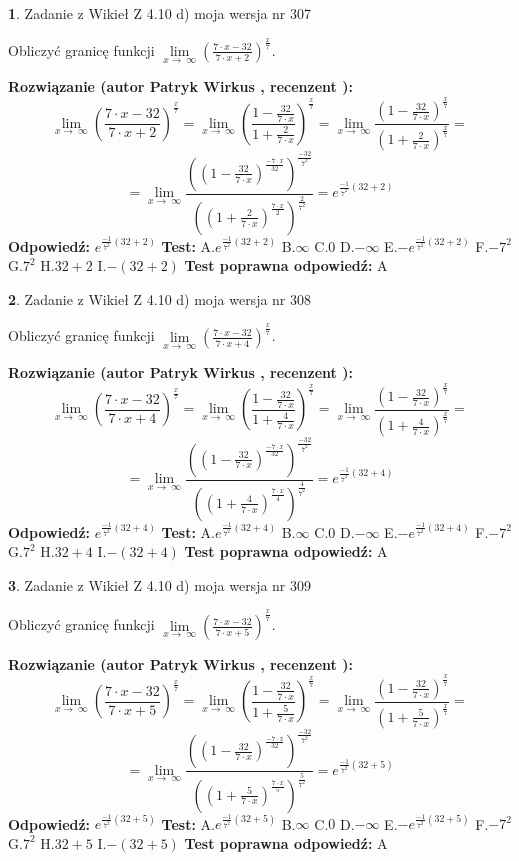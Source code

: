 \documentclass[12pt, a4paper]{article}
\theoremstyle{definition} %
\newtheorem{zad}{}
\newcommand{\zadStart}[1]{\begin{zad}#1\newline}
\newcommand{\zadStop}{\end{zad}}
\newcommand{\rozwStart}[2]{\noindent \textbf{Rozwiązanie (autor #1 , recenzent #2): }\newline}
\newcommand{\rozwStop}{\newline}
\newcommand{\odpStart}{\noindent \textbf{Odpowiedź:}\newline}
\newcommand{\odpStop}{\newline}
\newcommand{\testStart}{\noindent \textbf{Test:}\newline}
\newcommand{\testStop}{\newline}
\newcommand{\kluczStart}{\noindent \textbf{Test poprawna odpowiedź:}\newline}
\newcommand{\kluczStop}{\newline}
\begin{document}
\zadStart{Zadanie z Wikieł Z 4.10 d) moja wersja nr 307}


Obliczyć granicę funkcji  $\lim\limits_{x\to\ \infty}(\frac{7\cdot x-32}{7\cdot x+2})^{\frac{x}{7}}$.
\zadStop
\rozwStart{Patryk Wirkus}{}
$$\lim\limits_{x\to\ \infty}(\frac{7\cdot x-32}{7\cdot x+2})^{\frac{x}{7}} = \lim\limits_{x\to\ \infty}(\frac{1-\frac{32}{7\cdot x}}{1+\frac{2}{7\cdot x}})^{\frac{x}{7}}=\lim\limits_{x\to\ \infty}\frac{(1-\frac{32}{7\cdot x})^{\frac{x}{7}}}{(1+\frac{2}{7\cdot x})^{\frac{x}{7}}}=$$
$$=\lim\limits_{x\to\ \infty}\frac{((1-\frac{32}{7\cdot x})^{\frac{-7\cdot x}{32}})^{\frac{-32}{7^{2}}}}{((1+\frac{2}{7\cdot x})^{\frac{7\cdot x}{2}})^{\frac{2}{7^{2}}}}=e^{\frac{-1}{7^{2}}(32+2)}$$
\rozwStop
\odpStart
$e^{\frac{-1}{7^{2}}(32+2)}$
\odpStop
\testStart
A.$e^{\frac{-1}{7^{2}}(32+2)}$ B.$\infty$ C.$0$ D.$-\infty$ E.$-e^{\frac{-1}{7^{2}}(32+2)}$
F.$-7^{2}$ G.$7^{2}$
H.$32+2$
I.$-(32+2)$
\testStop
\kluczStart
A
\kluczStop



\zadStart{Zadanie z Wikieł Z 4.10 d) moja wersja nr 308}


Obliczyć granicę funkcji  $\lim\limits_{x\to\ \infty}(\frac{7\cdot x-32}{7\cdot x+4})^{\frac{x}{7}}$.
\zadStop
\rozwStart{Patryk Wirkus}{}
$$\lim\limits_{x\to\ \infty}(\frac{7\cdot x-32}{7\cdot x+4})^{\frac{x}{7}} = \lim\limits_{x\to\ \infty}(\frac{1-\frac{32}{7\cdot x}}{1+\frac{4}{7\cdot x}})^{\frac{x}{7}}=\lim\limits_{x\to\ \infty}\frac{(1-\frac{32}{7\cdot x})^{\frac{x}{7}}}{(1+\frac{4}{7\cdot x})^{\frac{x}{7}}}=$$
$$=\lim\limits_{x\to\ \infty}\frac{((1-\frac{32}{7\cdot x})^{\frac{-7\cdot x}{32}})^{\frac{-32}{7^{2}}}}{((1+\frac{4}{7\cdot x})^{\frac{7\cdot x}{4}})^{\frac{4}{7^{2}}}}=e^{\frac{-1}{7^{2}}(32+4)}$$
\rozwStop
\odpStart
$e^{\frac{-1}{7^{2}}(32+4)}$
\odpStop
\testStart
A.$e^{\frac{-1}{7^{2}}(32+4)}$ B.$\infty$ C.$0$ D.$-\infty$ E.$-e^{\frac{-1}{7^{2}}(32+4)}$
F.$-7^{2}$ G.$7^{2}$
H.$32+4$
I.$-(32+4)$
\testStop
\kluczStart
A
\kluczStop



\zadStart{Zadanie z Wikieł Z 4.10 d) moja wersja nr 309}


Obliczyć granicę funkcji  $\lim\limits_{x\to\ \infty}(\frac{7\cdot x-32}{7\cdot x+5})^{\frac{x}{7}}$.
\zadStop
\rozwStart{Patryk Wirkus}{}
$$\lim\limits_{x\to\ \infty}(\frac{7\cdot x-32}{7\cdot x+5})^{\frac{x}{7}} = \lim\limits_{x\to\ \infty}(\frac{1-\frac{32}{7\cdot x}}{1+\frac{5}{7\cdot x}})^{\frac{x}{7}}=\lim\limits_{x\to\ \infty}\frac{(1-\frac{32}{7\cdot x})^{\frac{x}{7}}}{(1+\frac{5}{7\cdot x})^{\frac{x}{7}}}=$$
$$=\lim\limits_{x\to\ \infty}\frac{((1-\frac{32}{7\cdot x})^{\frac{-7\cdot x}{32}})^{\frac{-32}{7^{2}}}}{((1+\frac{5}{7\cdot x})^{\frac{7\cdot x}{5}})^{\frac{5}{7^{2}}}}=e^{\frac{-1}{7^{2}}(32+5)}$$
\rozwStop
\odpStart
$e^{\frac{-1}{7^{2}}(32+5)}$
\odpStop
\testStart
A.$e^{\frac{-1}{7^{2}}(32+5)}$ B.$\infty$ C.$0$ D.$-\infty$ E.$-e^{\frac{-1}{7^{2}}(32+5)}$
F.$-7^{2}$ G.$7^{2}$
H.$32+5$
I.$-(32+5)$
\testStop
\kluczStart
A
\kluczStop
\end{document}
